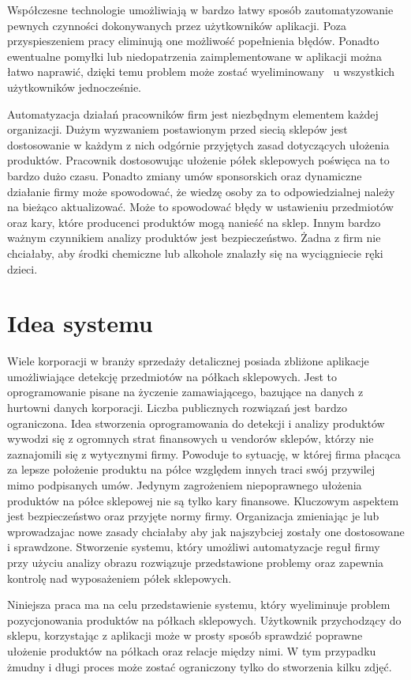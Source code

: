 Współczesne technologie umożliwiają w bardzo łatwy sposób zautomatyzowanie pewnych czynności dokonywanych przez użytkowników aplikacji. Poza przyspieszeniem pracy eliminują one możliwość popełnienia błędów. Ponadto ewentualne pomyłki lub niedopatrzenia zaimplementowane w aplikacji można łatwo naprawić, dzięki temu problem może zostać wyeliminowany ~u wszystkich użytkowników jednocześnie. 

Automatyzacja działań pracowników firm jest niezbędnym elementem każdej organizacji. Dużym wyzwaniem postawionym przed siecią sklepów jest dostosowanie w każdym z nich odgórnie przyjętych zasad dotyczących ułożenia produktów. Pracownik dostosowując ułożenie półek sklepowych poświęca na to bardzo dużo czasu. Ponadto zmiany umów sponsorskich oraz dynamiczne działanie firmy może spowodować, że wiedzę osoby za to odpowiedzialnej należy na bieżąco aktualizować. Może to spowodować błędy w ustawieniu przedmiotów oraz kary, które producenci produktów mogą nanieść na sklep. Innym bardzo ważnym czynnikiem analizy produktów jest bezpieczeństwo. Żadna z firm nie chciałaby, aby środki chemiczne lub alkohole znalazły się na wyciągniecie ręki dzieci.

\section{Idea systemu}
Wiele korporacji w branży sprzedaży detalicznej posiada zbliżone aplikacje umożliwiające detekcję przedmiotów na półkach sklepowych. Jest to oprogramowanie pisane na życzenie zamawiającego, bazujące na danych z hurtowni danych korporacji. Liczba publicznych rozwiązań jest bardzo ograniczona. 
Idea stworzenia oprogramowania do detekcji i analizy produktów wywodzi się z ogromnych strat finansowych u vendorów sklepów, którzy nie zaznajomili się z wytycznymi firmy. Powoduje to sytuację, w której firma płacąca za lepsze położenie produktu na półce względem innych traci swój przywilej mimo podpisanych umów. Jedynym zagrożeniem niepoprawnego ułożenia produktów na półce sklepowej nie są tylko kary finansowe. Kluczowym aspektem jest bezpieczeństwo oraz przyjęte normy firmy. Organizacja zmieniając je lub wprowadzajac nowe zasady chciałaby aby jak najszybciej zostały one dostosowane i sprawdzone. Stworzenie systemu, który umożliwi automatyzacje reguł firmy przy użyciu analizy obrazu rozwiązuje przedstawione problemy oraz zapewnia kontrolę nad wyposażeniem półek sklepowych.

Niniejsza praca ma na celu przedstawienie systemu, który wyeliminuje problem pozycjonowania produktów na półkach sklepowych. Użytkownik przychodzący do sklepu, korzystając z aplikacji może w prosty sposób sprawdzić poprawne ułożenie produktów na półkach oraz relacje między nimi. W tym przypadku żmudny i długi proces może zostać ograniczony tylko do stworzenia kilku zdjęć. 

